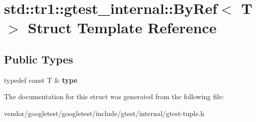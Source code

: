 \hypertarget{structstd_1_1tr1_1_1gtest__internal_1_1ByRef}{}\section{std\+:\+:tr1\+:\+:gtest\+\_\+internal\+:\+:By\+Ref$<$ T $>$ Struct Template Reference}
\label{structstd_1_1tr1_1_1gtest__internal_1_1ByRef}
\subsection*{Public Types}
\begin{DoxyCompactItemize}
\item 
typedef const T \& {\bfseries type}\hypertarget{structstd_1_1tr1_1_1gtest__internal_1_1ByRef_ac42ad942ee1cfa86b2abcce9b88ac10e}{}\label{structstd_1_1tr1_1_1gtest__internal_1_1ByRef_ac42ad942ee1cfa86b2abcce9b88ac10e}

\end{DoxyCompactItemize}


The documentation for this struct was generated from the following file\+:\begin{DoxyCompactItemize}
\item 
vendor/googletest/googletest/include/gtest/internal/gtest-\/tuple.\+h\end{DoxyCompactItemize}
